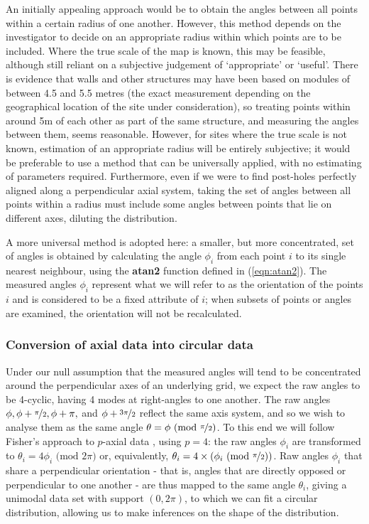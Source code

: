 \documentclass[../../ArchStats.tex]{subfiles}
\begin{document}
An initially appealing approach would be to obtain the angles between all points within a certain radius of one another. However, this method depends on the investigator to decide on an appropriate radius within which points are to be included. Where the true scale of the map is known, this may be feasible, although still  reliant on a subjective judgement of `appropriate' or `useful'. There is evidence \cite{Kendall2013} that walls and other structures may have been based on modules of between 4.5 and 5.5 metres (the exact measurement depending on the geographical location of the site under consideration), so treating points within around 5m of each other as part of the same structure, and measuring the angles between them, seems reasonable. However, for sites where the true scale is not known, estimation of an appropriate radius will be entirely subjective; it would be preferable to use a method that can be universally applied, with no estimating of parameters required. Furthermore, even if we were to find post-holes perfectly aligned along a perpendicular axial system, taking the set of angles between all points within a radius must include some angles between points that lie on different axes, diluting the distribution.

A more universal method is adopted here: a smaller, but more concentrated, set of angles is obtained by calculating the angle $\phi_i$ from each point $i$ to its single nearest neighbour, using the \textbf{atan2} function defined in (\ref{eqn:atan2}). The measured angles $\phi_i$ represent what we will refer to as the orientation of the points $i$ and is considered to be a fixed attribute of $i$; when subsets of points or angles are examined, the orientation will not be recalculated.



\subsubsection{Conversion of axial data into circular data}
Under our null assumption that the measured angles will tend to be concentrated around the perpendicular axes of an underlying grid, we expect the raw angles to be 4-cyclic, having 4 modes at right-angles to one another. The raw angles $\phi, \phi + \nicefrac{\pi}{2}, \phi + \pi,$ and $\phi + \nicefrac{3\pi}{2}$ reflect the same axis system, and so we wish to analyse them as the same angle $\theta = \phi \text{ (mod }\nicefrac{\pi}{2})$.
To this end we will follow Fisher's approach to $p$-axial data \cite{Fisher1993}, using $p=4$: the raw angles $\phi_i$ are transformed to $\theta_i = 4\phi_i \text{ (mod } 2\pi)$ or, equivalently, $\theta_i = 4 \times \left( \phi_i \text{ (mod }\nicefrac{\pi}{2})\right)$. Raw angles $\phi_i$ that share a perpendicular orientation - that is, angles that are directly opposed or perpendicular to one another - are thus mapped to the same angle $\theta_i$,  giving a unimodal data set with support $(0, 2\pi)$, to which we can fit a circular distribution, allowing us to make inferences on the shape of the distribution.
\end{document}
